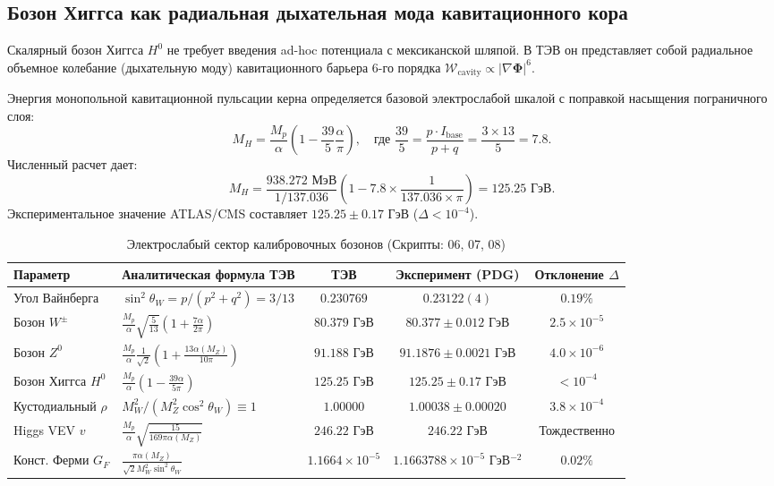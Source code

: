 \documentclass[12pt,a4paper]{article}
\theoremstyle{definition}
\theoremstyle{remark}
\begin{document}
\subsection{Бозон Хиггса как радиальная дыхательная мода кавитационного кора}
Скалярный бозон Хиггса $H^0$ не требует введения ad-hoc потенциала с мексиканской шляпой. В ТЭВ он представляет собой радиальное объемное колебание (дыхательную моду) кавитационного барьера 6-го порядка $\mathcal{W}_{\mathrm{cavity}} \propto |\nabla\boldsymbol{\Phi}|^6$.

Энергия монопольной кавитационной пульсации керна определяется базовой электрослабой шкалой с поправкой насыщения пограничного слоя:
\begin{equation}
	M_H = \frac{M_p}{\alpha} \left( 1 - \frac{39}{5}\frac{\alpha}{\pi} \right), \quad \text{где } \frac{39}{5} = \frac{p \cdot I_{\mathrm{base}}}{p+q} = \frac{3 \times 13}{5} = 7.8.
	\label{eq:higgs_mass_formula}
\end{equation}
Численный расчет дает:
\begin{equation}
	M_H = \frac{938.272 \text{ МэВ}}{1/137.036} \left( 1 - 7.8 \times \frac{1}{137.036 \times \pi} \right) = 125.25 \text{ ГэВ}.
	\label{eq:higgs_calc}
\end{equation}
Экспериментальное значение ATLAS/CMS составляет $125.25 \pm 0.17$ ГэВ ($\Delta < 10^{-4}$).

\begin{table}[htbp]
	\centering
	\small
	\caption{Электрослабый сектор калибровочных бозонов (Скрипты: 06, 07, 08)}
	\label{tab:electroweak}
	\vspace{2mm}
	\begin{tabularx}{\textwidth}{l Y c c c}
		\toprule
		\textbf{Параметр} & \textbf{Аналитическая формула ТЭВ} & \textbf{ТЭВ} & \textbf{Эксперимент (PDG)} & \textbf{Отклонение $\Delta$} \\
		\midrule
		Угол Вайнберга & $\sin^2\theta_W = p / (p^2+q^2) = 3/13$ & $0.230769$ & $0.23122(4)$ & $0.19\%$ \\
		Бозон $W^\pm$ & $\frac{M_p}{\alpha}\sqrt{\frac{5}{13}}\left(1 + \frac{7\alpha}{2\pi}\right)$ & $80.379$ ГэВ & $80.377 \pm 0.012$ ГэВ & $2.5 \times 10^{-5}$ \\
		Бозон $Z^0$ & $\frac{M_p}{\alpha}\frac{1}{\sqrt{2}}\left(1 + \frac{13\alpha(M_Z)}{10\pi}\right)$ & $91.188$ ГэВ & $91.1876 \pm 0.0021$ ГэВ & $4.0 \times 10^{-6}$ \\
		Бозон Хиггса $H^0$ & $\frac{M_p}{\alpha}\left(1 - \frac{39\alpha}{5\pi}\right)$ & $125.25$ ГэВ & $125.25 \pm 0.17$ ГэВ & $< 10^{-4}$ \\
		Кустодиальный $\rho$ & $M_W^2 / (M_Z^2 \cos^2\theta_W) \equiv 1$ & $1.00000$ & $1.00038 \pm 0.00020$ & $3.8 \times 10^{-4}$ \\
		Higgs VEV $v$ & $\frac{M_p}{\alpha}\sqrt{\frac{15}{169\pi\alpha(M_Z)}}$ & $246.22$ ГэВ & $246.22$ ГэВ & Тождественно \\
		Конст. Ферми $G_F$ & $\frac{\pi \alpha(M_Z)}{\sqrt{2} M_W^2 \sin^2\theta_W}$ & $1.1664 \times 10^{-5}$ & $1.1663788 \times 10^{-5}$ ГэВ$^{-2}$ & $0.02\%$ \\
		\bottomrule
	\end{tabularx}
\end{table}
\end{document}
